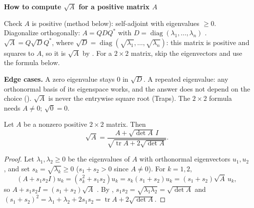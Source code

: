 \documentclass[10pt]{scrartcl}
\DeclareMathOperator{\tr}{tr}\DeclareMathOperator{\nul}{null}\DeclareMathOperator{\range}{range}\DeclareMathOperator{\spn}{span}
\newenvironment{methodbox}[1]{\begin{mdframed}[style=mdbluebox,linecolor=NavyBlue,backgroundcolor=NavyBlue!3]\textbf{\color{NavyBlue}#1}\par\vspace{2pt}}{\end{mdframed}}
\begin{document}
\begin{methodbox}{How to compute $\sqrt{A}$ for a positive matrix $A$}
\begin{enumerate}[label=\arabic*.,leftmargin=1.5em,itemsep=2pt,topsep=2pt]
  \ii Check $A$ is positive (method below): self-adjoint with eigenvalues $\ge0$.
  \ii Diagonalize orthogonally: $A=QDQ^*$ with $D=\operatorname{diag}(\lambda_1,\dots,\lambda_n)$ .
  \ii $\sqrt{A}=Q\sqrt{D}Q^*$, where $\sqrt{D}=\operatorname{diag}(\sqrt{\lambda_1},\dots,\sqrt{\lambda_n})$: this matrix is positive and squares to $A$, so it is $\sqrt A$ by .
  \ii For a $2\times2$ matrix, skip the eigenvectors and use the formula below.
\end{enumerate}
\textbf{Edge cases.} A zero eigenvalue stays $0$ in $\sqrt D$. A repeated eigenvalue: any orthonormal basis of its eigenspace works, and the answer does not depend on the choice (). $\sqrt{A}$ is never the entrywise square root (Traps). The $2\times2$ formula needs $A\ne0$; $\sqrt0=0$.
\end{methodbox}

\begin{proposition*}
  Let $A$ be a nonzero positive $2\times2$ matrix. Then
  \[
    \sqrt{A} = \frac{A + \sqrt{\det A}\,I}{\sqrt{\tr A + 2\sqrt{\det A}}}.
  \]
\end{proposition*}
\begin{proof}
  Let $\lambda_1,\lambda_2\ge0$ be the eigenvalues of $A$ with orthonormal eigenvectors $u_1,u_2$, and set $s_k=\sqrt{\lambda_k}\ge0$ ($s_1+s_2>0$ since $A\neq0$). For $k=1,2$,
  \[
    (A+s_1s_2 I)u_k = (s_k^2+s_1s_2)u_k = s_k(s_1+s_2)u_k = (s_1+s_2)\sqrt{A}\,u_k,
  \]
  so $A+s_1s_2 I = (s_1+s_2)\sqrt{A}$ . By , $s_1s_2=\sqrt{\lambda_1\lambda_2}=\sqrt{\det A}$ and $(s_1+s_2)^2=\lambda_1+\lambda_2+2s_1s_2=\tr A+2\sqrt{\det A}$.
\end{proof}
\end{document}
